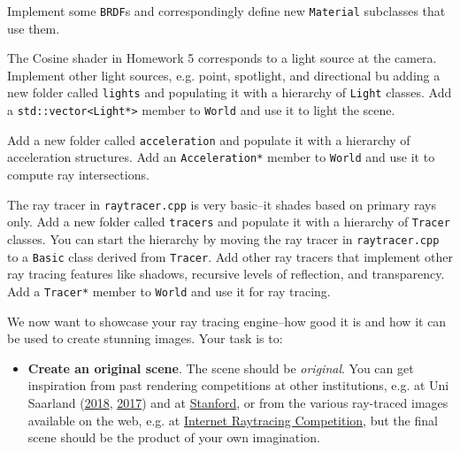 \documentclass[addpoints]{exam}
\begin{document}
\begin{questions}
  
  Implement some \texttt{BRDF}s and correspondingly define new \texttt{Material} subclasses that use them.

  The Cosine shader in Homework 5 corresponds to a light source at the camera. Implement other light sources, e.g. point, spotlight, and directional bu adding a new folder called \texttt{lights} and populating it with a hierarchy of \texttt{Light} classes. Add a \texttt{std::vector<Light*>} member to \texttt{World} and use it to light the scene.

  Add a new folder called \texttt{acceleration} and populate it with a hierarchy of acceleration structures. Add an \texttt{Acceleration*} member to \texttt{World} and use it to compute ray intersections.

  The ray tracer in \texttt{raytracer.cpp} is very basic--it shades based on primary rays only. Add a new folder called \texttt{tracers} and populate it with a hierarchy of \texttt{Tracer} classes. You can start the hierarchy by moving the ray tracer in \texttt{raytracer.cpp} to a \texttt{Basic} class derived from \texttt{Tracer}. Add other ray tracers that implement other ray tracing features like shadows, recursive levels of reflection, and transparency. Add a \texttt{Tracer*} member to \texttt{World} and use it for ray tracing.

  \newpage
  We now want to showcase your ray tracing engine--how good it is and how it can be used to create stunning images. Your task is to:
  \begin{itemize}
  \item \textbf{Create an original scene}. The scene should be \emph{original}. You can get inspiration from past rendering competitions at other institutions, e.g. at Uni Saarland (\href{https://graphics.cg.uni-saarland.de/courses/cg1-2018/#rendering-competition}{2018}, \href{https://graphics.cg.uni-saarland.de/courses/cg1-2017/#rendering-competition}{2017}) and at \href{https://graphics.stanford.edu/courses/cs348b-competition/}{Stanford}, or from the various ray-traced images available on the web, e.g. at \href{http://www.irtc.org/stills/}{Internet Raytracing Competition}, but the final scene should be the product of your own imagination.
    

\end{itemize}
\end{questions}
\end{document}
